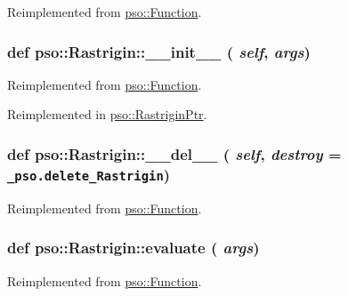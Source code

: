 Reimplemented from \hyperlink{classpso_1_1Function_959f07a6de4f333461fdb0261e6c25ae}{pso::Function}.\hypertarget{classpso_1_1Rastrigin_6a38343c1d2870431835ecb1a82d43b2}{
\subsubsection{\setlength{\rightskip}{0pt plus 5cm}def pso::Rastrigin::\_\-\_\-init\_\-\_\- ( {\em self}, \/   {\em args})}}
\label{classpso_1_1Rastrigin_6a38343c1d2870431835ecb1a82d43b2}




Reimplemented from \hyperlink{classpso_1_1Function_6874097c6476dc85af64b40e76a807e9}{pso::Function}.

Reimplemented in \hyperlink{classpso_1_1RastriginPtr_e68fff937daab154626622e257267a58}{pso::RastriginPtr}.\hypertarget{classpso_1_1Rastrigin_4ec1ea0cb3ef15cb5355eb5b36cfeabf}{
\subsubsection{\setlength{\rightskip}{0pt plus 5cm}def pso::Rastrigin::\_\-\_\-del\_\-\_\- ( {\em self}, \/   {\em destroy} = {\tt \_\-pso.delete\_\-Rastrigin})}}
\label{classpso_1_1Rastrigin_4ec1ea0cb3ef15cb5355eb5b36cfeabf}




Reimplemented from \hyperlink{classpso_1_1Function_c80bd40fcf4a956e5732ed099bccc598}{pso::Function}.\hypertarget{classpso_1_1Rastrigin_6aaed0f64f959a9666321763e3ff8efe}{
\subsubsection{\setlength{\rightskip}{0pt plus 5cm}def pso::Rastrigin::evaluate ( {\em args})}}
\label{classpso_1_1Rastrigin_6aaed0f64f959a9666321763e3ff8efe}




Reimplemented from \hyperlink{classpso_1_1Function_7c958ea6d942a89ae219b872b4d73541}{pso::Function}.

